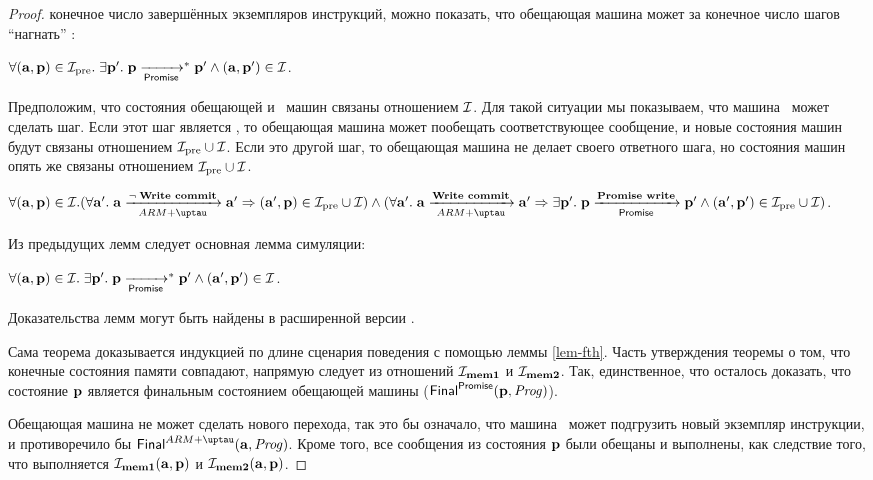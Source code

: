 \begin{proof}
конечное число завершённых экземпляров инструкций, можно показать, что
обещающая машина может за конечное число шагов ``нагнать'' \ARMt:
\begin{lemma}
\label{lem-trd}
$\forall (\mathbf{a}, \mathbf{p}) \in \mathcal{I}_{\textup{\rm pre}}. \;
\exists \mathbf{p}'. \; \mathbf{p} \xrightarrow[\mathsf{Promise}]{}^{*} \mathbf{p}' \land (\mathbf{a}, \mathbf{p}') \in \mathcal{I}$.
\end{lemma}
\noindent
Предположим, что состояния обещающей и \ARMt~машин связаны отношением $\mathcal{I}$.
Для такой ситуации мы показываем, что машина \ARMt~может сделать шаг.
Если этот шаг является , то обещающая машина
может пообещать соответствующее сообщение, и новые состояния машин будут
связаны отношением $\mathcal{I}_{\textup{\rm pre}} \cup \mathcal{I}$.
Если это другой шаг, то обещающая машина не делает своего ответного шага,
но состояния машин опять же связаны отношением $\mathcal{I}_{\textup{\rm pre}} \cup \mathcal{I}$.
\begin{lemma}
\label{lem-fst}
$\forall (\aT, \p) \in \simrel. \\
(\forall \aT'. \; \aT \armStepgen{\lnot \; \transenv{Write commit}} \aT' \Rightarrow (\aT', \p) \in \simrelPre \cup \simrel) \land {} \\
(\forall \aT'. \; \aT \armStepgen{\transenv{Write commit}} \aT' \Rightarrow
\exists \p'. \; \p \promStepgen{\transenv{Promise write}} \p' \land  (\aT', \p') \in \simrelPre \cup \simrel)$.
\end{lemma}
Из предыдущих лемм следует основная лемма симуляции:
\begin{lemma}
  \label{lem-fth}
$\forall (\mathbf{a}, \mathbf{p}) \in \mathcal{I}. \;
\exists \mathbf{p}'. \; \mathbf{p} \xrightarrow[\mathsf{Promise}]{}^{*} \mathbf{p}' \land (\mathbf{a}', \mathbf{p}') \in \mathcal{I}$.
\end{lemma}
\noindent
Доказательства лемм могут быть найдены в расширенной версии \cite{Podkopaev-al:ECOOP17}.

Сама теорема доказывается индукцией по длине сценария поведения с помощью леммы \ref{lem-fth}.
Часть утверждения теоремы о том, что конечные состояния памяти совпадают,
напрямую следует из отношений $\mathcal{I}_{\rm \bf mem1}$ и $\mathcal{I}_{\rm \bf mem2}$.
Так, единственное, что осталось доказать, что состояние $\mathbf{p}$ является
финальным состоянием обещающей машины ($\mathsf{Final}^{\mathsf{Promise}}(\mathbf{p}, \mathit{Prog})$).

Обещающая машина не может сделать нового перехода, так это бы означало, что
машина \ARMt~может подгрузить новый экземпляр инструкции, и противоречило бы 
$\finalStateA(\aT, \Cfarm)$. Кроме того, все сообщения из состояния $\mathbf{p}$
были обещаны и выполнены, как следствие того, что выполняется
$\mathcal{I}_{\rm \bf mem1}(\mathbf{a},\mathbf{p})$ и $\mathcal{I}_{\rm \bf mem2}(\mathbf{a}, \mathbf{p})$.
\end{proof}

